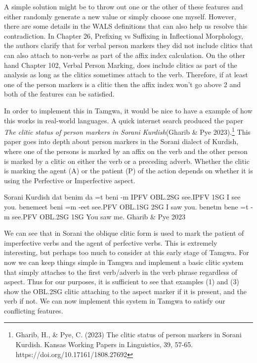 \documentclass[a4paper,12pt,twoside,openright]{memoir}
\begin{document}
A simple solution might be to throw out one or the other of these features and either randomly generate a new value or simply choose one myself.  However, there are some details in the WALS definitions that can also help us resolve this contradiction.  In Chapter 26, Prefixing vs Suffixing in Inflectional Morphology, the authors clarify that for verbal person markers they did not include clitics that can also attach to non-verbs as part of the affix index calculation.  On the other hand Chapter 102, Verbal Person Marking, does include clitics as part of the analysis as long as the clitics sometimes attach to the verb.  Therefore, if at least one of the person markers is a clitic then the affix index won't go above 2 and both of the features can be satisfied.

In order to implement this in Tamgwa, it would be nice to have a example of how this works in real-world languages.  A quick internet search produced the paper \textit{The clitic status of person markers in Sorani Kurdish}(Gharib \& Pye 2023).\footnote{Gharib, H., \& Pye, C. (2023) The clitic status of person markers in Sorani Kurdish. Kansas Working Papers in Linguistics, 39, 57-65. https://doi.org/10.17161/1808.27692}  This paper goes into depth about person markers in the Sorani dialect of Kurdish, where one of the persons is marked by an affix on the verb and the other person is marked by a clitic on either the verb or a preceding adverb.  Whether the clitic is marking the agent (A) or the patient (P) of the action depends on whether it is using the Perfective or Imperfective aspect.

\begin{examples}
    \ex
    \lect Sorani Kurdish
    \words {} dat  benim
    \bits da =t beni -m
    \gloss IPFV OBL.2SG see.IPFV 1SG
    \tr I see you.
    \ex
    \words {} benemeet
    \bits beni =m -eet
    \gloss see.PFV OBL.1SG 2SG
    \tr I saw you.
    \ex
    \words {} benetm
    \bits bene =t -m
    \gloss see.PFV OBL.2SG 1SG
    \tr You saw me.
    \source Gharib \& Pye 2023
\end{examples}

We can see that in Sorani the oblique clitic form is used to mark the patient of imperfective verbs and the agent of perfective verbs.  This is extremely interesting, but perhaps too much to consider at this early stage of Tamgwa.  For now we can keep things simple in Tamgwa and implement a basic clitic system that simply attaches to the first verb/adverb in the verb phrase regardless of aspect.  Thus for our purposes, it is sufficient to see that examples (1) and (3) show the OBL.2SG clitic attaching to the aspect marker if it is present, and the verb if not.  We can now implement this system in Tamgwa to satisfy our conflicting features.
\end{document}
